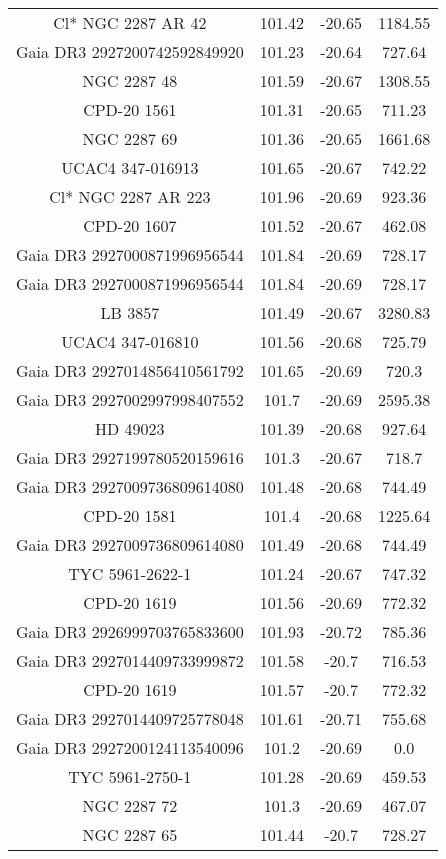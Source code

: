\begin{table}
\begin{tabular}{cccc}
Cl* NGC 2287     AR      42 & 101.42 & -20.65 & 1184.55 \\
Gaia DR3 2927200742592849920 & 101.23 & -20.64 & 727.64 \\
NGC  2287    48 & 101.59 & -20.67 & 1308.55 \\
CPD-20  1561 & 101.31 & -20.65 & 711.23 \\
NGC  2287    69 & 101.36 & -20.65 & 1661.68 \\
UCAC4 347-016913 & 101.65 & -20.67 & 742.22 \\
Cl* NGC 2287     AR     223 & 101.96 & -20.69 & 923.36 \\
CPD-20  1607 & 101.52 & -20.67 & 462.08 \\
Gaia DR3 2927000871996956544 & 101.84 & -20.69 & 728.17 \\
Gaia DR3 2927000871996956544 & 101.84 & -20.69 & 728.17 \\
LB  3857 & 101.49 & -20.67 & 3280.83 \\
UCAC4 347-016810 & 101.56 & -20.68 & 725.79 \\
Gaia DR3 2927014856410561792 & 101.65 & -20.69 & 720.3 \\
Gaia DR3 2927002997998407552 & 101.7 & -20.69 & 2595.38 \\
HD  49023 & 101.39 & -20.68 & 927.64 \\
Gaia DR3 2927199780520159616 & 101.3 & -20.67 & 718.7 \\
Gaia DR3 2927009736809614080 & 101.48 & -20.68 & 744.49 \\
CPD-20  1581 & 101.4 & -20.68 & 1225.64 \\
Gaia DR3 2927009736809614080 & 101.49 & -20.68 & 744.49 \\
TYC 5961-2622-1 & 101.24 & -20.67 & 747.32 \\
CPD-20  1619 & 101.56 & -20.69 & 772.32 \\
Gaia DR3 2926999703765833600 & 101.93 & -20.72 & 785.36 \\
Gaia DR3 2927014409733999872 & 101.58 & -20.7 & 716.53 \\
CPD-20  1619 & 101.57 & -20.7 & 772.32 \\
Gaia DR3 2927014409725778048 & 101.61 & -20.71 & 755.68 \\
Gaia DR3 2927200124113540096 & 101.2 & -20.69 & 0.0 \\
TYC 5961-2750-1 & 101.28 & -20.69 & 459.53 \\
NGC  2287    72 & 101.3 & -20.69 & 467.07 \\
NGC  2287    65 & 101.44 & -20.7 & 728.27 \\

\end{tabular}
\end{table}

